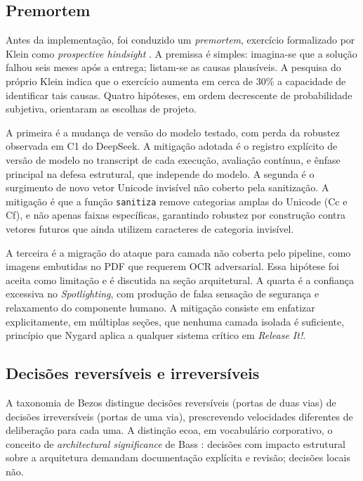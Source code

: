 \documentclass[11pt,a4paper]{article}
\begin{document}
\subsection{Premortem}

Antes da implementação, foi conduzido um \emph{premortem}, exercício formalizado por Klein como \emph{prospective hindsight} \cite{klein2007}. A premissa é simples: imagina-se que a solução falhou seis meses após a entrega; listam-se as causas plausíveis. A pesquisa do próprio Klein indica que o exercício aumenta em cerca de 30\% a capacidade de identificar tais causas. Quatro hipóteses, em ordem decrescente de probabilidade subjetiva, orientaram as escolhas de projeto.

A primeira é a mudança de versão do modelo testado, com perda da robustez observada em C1 do DeepSeek. A mitigação adotada é o registro explícito de versão de modelo no transcript de cada execução, avaliação contínua, e ênfase principal na defesa estrutural, que independe do modelo. A segunda é o surgimento de novo vetor Unicode invisível não coberto pela sanitização. A mitigação é que a função \texttt{sanitiza} remove categorias amplas do Unicode (Cc e Cf), e não apenas faixas específicas, garantindo robustez por construção contra vetores futuros que ainda utilizem caracteres de categoria invisível.

A terceira é a migração do ataque para camada não coberta pelo pipeline, como imagens embutidas no PDF que requerem OCR adversarial. Essa hipótese foi aceita como limitação e é discutida na seção arquitetural. A quarta é a confiança excessiva no \emph{Spotlighting}, com produção de falsa sensação de segurança e relaxamento do componente humano. A mitigação consiste em enfatizar explicitamente, em múltiplas seções, que nenhuma camada isolada é suficiente, princípio que Nygard \cite{nygard2018} aplica a qualquer sistema crítico em \emph{Release It!}.

\subsection{Decisões reversíveis e irreversíveis}

A taxonomia de Bezos distingue decisões reversíveis (portas de duas vias) de decisões irreversíveis (portas de uma via), prescrevendo velocidades diferentes de deliberação para cada uma. A distinção ecoa, em vocabulário corporativo, o conceito de \emph{architectural significance} de Bass \cite{bass2012}: decisões com impacto estrutural sobre a arquitetura demandam documentação explícita e revisão; decisões locais não.
\end{document}
